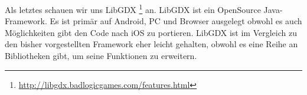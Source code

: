 Als letztes schauen wir uns LibGDX \footnote{\url{http://libgdx.badlogicgames.com/features.html}} an. LibGDX ist ein OpenSource Java-Framework. Es ist primär auf Android, PC und Browser ausgelegt obwohl es auch Möglichkeiten gibt den Code nach iOS zu portieren. LibGDX ist im Vergleich zu den bisher vorgestellten Framework eher leicht gehalten, obwohl es eine Reihe an Bibliotheken gibt, um seine Funktionen zu erweitern.